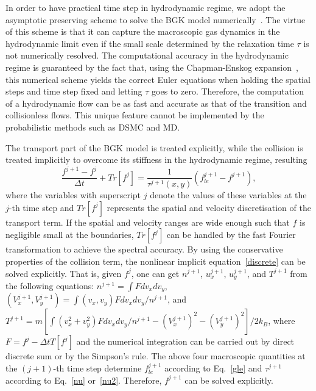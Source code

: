 In order to have practical time step in hydrodynamic regime, we adopt the asymptotic preserving scheme to solve the BGK model numerically~\cite{Jin1999,Filbet2011}. The virtue of this scheme is that it can capture the macroscopic gas dynamics in the hydrodynamic limit even if the small scale determined by the relaxation time $\tau$ is not numerically resolved. The computational accuracy in the hydrodynamic regime is guaranteed by the fact that, using the Chapman-Enskog expansion~\cite{CE}, this numerical scheme yields the correct Euler equations when holding the spatial steps and time step fixed and letting $\tau$ goes to zero. Therefore, the computation of a hydrodynamic flow can be as fast and accurate as that of the transition and collisionless flows. This unique feature cannot be implemented by the probabilistic methods such as DSMC and MD.





The transport part of the BGK model is treated explicitly, while the collision is treated implicitly to overcome its stiffness in the hydrodynamic regime, resulting
\begin{equation}\label{discrete}
    \frac{f^{j+1}-f^j}{\Delta
    t}+Tr[f^j]=\frac{1}{\tau^{j+1}(x,y)}(f_{le}^{j+1}-f^{j+1}),
\end{equation}
where the variables with superscript $j$ denote the values of these variables at the $j$-th time step and $Tr[f^j]$ represents the spatial and velocity discretisation of the transport term. If the spatial and velocity ranges are wide enough such that $f$ is negligible small at the boundaries, $Tr[f^j]$ can be handled by the fast Fourier transformation to achieve the spectral accuracy. By using the conservative properties of the collision term, the nonlinear implicit equation~\eqref{discrete} can be solved explicitly. That is, given $f^j$, one can get $n^{j+1}$, $u_x^{j+1}$, $u_y^{j+1}$, and $T^{j+1}$ from the following equations: $n^{j+1}=\int Fdv_xdv_y$, $(V_x^{j+1},V_y^{j+1})=\int (v_x,v_y)Fdv_xdv_y/n^{j+1}$, and $T^{j+1}=m[\int {(v_x^2+v_y^2)}Fdv_xdv_y/{n^{j+1}} -(V_x^{j+1})^2-(V_y^{j+1})^2]/{2k_B}$, where $F=f^j-\Delta tT[f^j]$ and the numerical integration can be carried out by direct discrete sum or by the Simpson's rule. The above four macroscopic quantities at the $(j+1)$-th time step determine $f_{le}^{j+1}$ according to Eq.~\eqref{gle} and $\tau^{j+1}$ according to Eq.~\eqref{nu} or~\eqref{nu2}. Therefore, $f^{j+1}$ can be solved explicitly.


